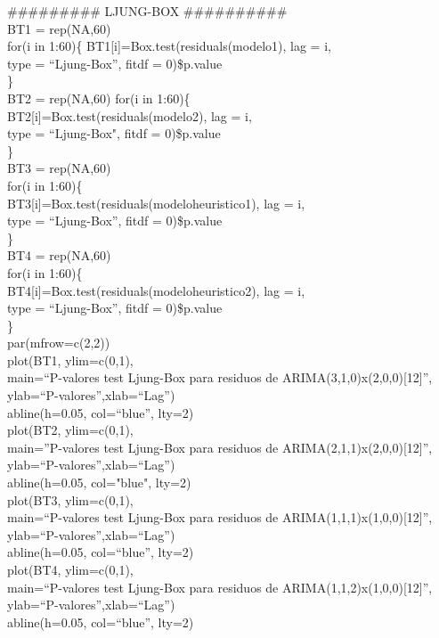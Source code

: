 \documentclass{report}
\begin{document}
\#\#\#\#\#\#\#\#\# LJUNG-BOX \#\#\#\#\#\#\#\#\#\#\\
BT1 = rep(NA,60)\\
for(i in 1:60)\{
  BT1[i]=Box.test(residuals(modelo1), lag = i,  \\
                  type = ``Ljung-Box'', fitdf = 0)\$p.value\\
\} \\
BT2 = rep(NA,60)
for(i in 1:60)\{\\
  BT2[i]=Box.test(residuals(modelo2), lag = i,\\
                  type = ``Ljung-Box", fitdf = 0)\$p.value\\
\} \\
BT3 = rep(NA,60)\\
for(i in 1:60)\{\\
  BT3[i]=Box.test(residuals(modeloheuristico1), lag = i,  \\
                  type = ``Ljung-Box'', fitdf = 0)\$p.value\\
\} \\
BT4 = rep(NA,60)\\
for(i in 1:60)\{\\
  BT4[i]=Box.test(residuals(modeloheuristico2), lag = i,\\  
                  type = ``Ljung-Box'', fitdf = 0)\$p.value\\
\} \\

par(mfrow=c(2,2))\\
plot(BT1, ylim=c(0,1),\\
main=``P-valores test Ljung-Box para residuos de ARIMA(3,1,0)x(2,0,0)[12]'',
     ylab=``P-valores'',xlab=``Lag'')\\
abline(h=0.05, col=``blue'', lty=2)\\
plot(BT2, ylim=c(0,1),\\
main=''P-valores test Ljung-Box para residuos de ARIMA(2,1,1)x(2,0,0)[12]'',
     ylab=``P-valores'',xlab=``Lag'')\\
abline(h=0.05, col="blue", lty=2)\\
plot(BT3, ylim=c(0,1),\\
main=``P-valores test Ljung-Box para residuos de ARIMA(1,1,1)x(1,0,0)[12]'',
     ylab=``P-valores'',xlab=``Lag'')\\
abline(h=0.05, col=``blue'', lty=2)\\
plot(BT4, ylim=c(0,1),\\
main=``P-valores test Ljung-Box para residuos de ARIMA(1,1,2)x(1,0,0)[12]'',
     ylab=``P-valores'',xlab=``Lag'')\\
abline(h=0.05, col=``blue'', lty=2)\\
\vspace{4cm}
\end{document}
